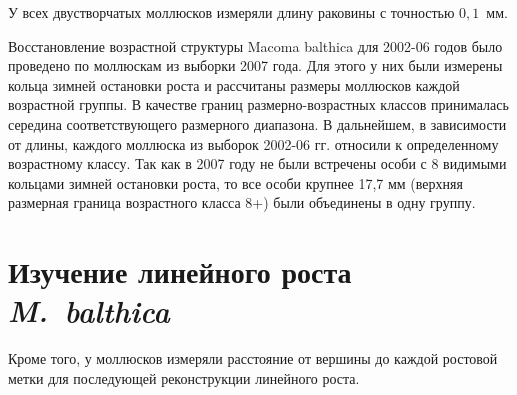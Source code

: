 \documentclass[12pt, a4paper]{disser}
\begin{document}
У всех двустворчатых моллюсков измеряли длину раковины с точностью $0,1$~мм. 

Восстановление возрастной структуры Macoma balthica для 2002-06 годов было проведено по моллюскам из выборки 2007 года. Для этого у них были измерены кольца зимней остановки роста и рассчитаны размеры моллюсков каждой возрастной группы. В качестве границ размерно-возрастных классов принималась середина соответствующего размерного диапазона. В дальнейшем, в зависимости от длины, каждого моллюска из выборок 2002-06 гг. относили к определенному возрастному классу. Так как в 2007 году не были встречены особи с 8 видимыми кольцами зимней остановки роста, то все особи крупнее 17,7 мм (верхняя размерная граница возрастного класса 8+) были объединены в одну группу.



	\section{Изучение линейного роста {\it M.~balthica}}

Кроме того, у моллюсков измеряли расстояние от вершины до каждой ростовой метки для последующей реконструкции линейного роста. 
\end{document}
